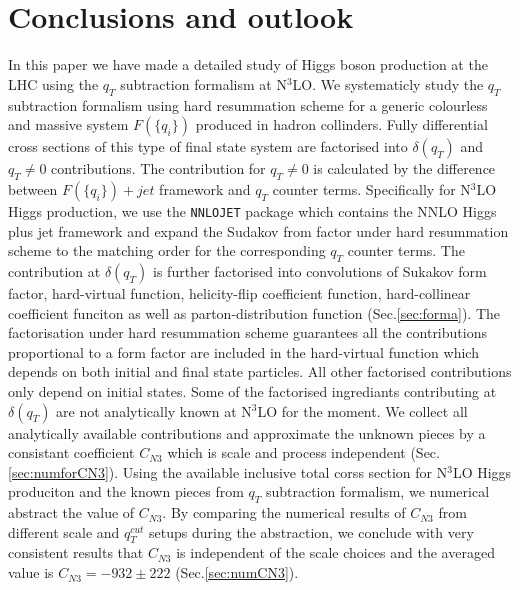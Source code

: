\documentclass[12pt]{article}
\begin{document}
\section{Conclusions and outlook}
\label{Sec:conclu}
In this paper we have made a detailed study of Higgs boson production at the LHC using the $q_T$ subtraction formalism at N$^3$LO. We systematicly study the $q_T$ subtraction formalism using hard resummation scheme for a generic colourless and massive system $F(\{q_i\})$ produced in hadron collinders. Fully differential cross sections of this type of final state system are factorised into $\delta(q_T)$ and $q_T\ne 0$ contributions. The contribution for $q_T\ne 0$ is calculated by the difference between $F(\{q_i\})+jet$ framework and $q_T$ counter terms. Specifically for N$^3$LO Higgs production, we use the \texttt{NNLOJET} package which contains the NNLO Higgs plus jet framework and expand the Sudakov from factor under hard resummation scheme to the matching order for the corresponding $q_T$ counter terms. The contribution at $\delta(q_T)$ is further factorised into convolutions of Sukakov form factor, hard-virtual function, helicity-flip coefficient function, hard-collinear coefficient funciton as well as parton-distribution function (Sec.\ref{sec:forma}). The factorisation under hard resummation scheme guarantees all the contributions proportional to a form factor are included in the hard-virtual function which depends on both initial and final state particles. All other factorised contributions only depend on initial states. Some of the factorised ingrediants contributing at $\delta(q_T)$ are not analytically known at N$^3$LO for the moment. We collect all analytically available contributions and approximate the unknown pieces by a consistant coefficient $C_{N3}$ which is scale and process independent (Sec.\ref{sec:numforCN3}). Using the available inclusive total corss section for N$^3$LO Higgs produciton and the known pieces from $q_T$ subtraction formalism, we numerical abstract the value of $C_{N3}$. By comparing the numerical results of $C_{N3}$ from different scale and $q_T^{cut}$ setups during the abstraction, we conclude with very consistent results that $C_{N3}$ is independent of the scale choices and the averaged value is $C_{N3}=-932\pm 222$ (Sec.\ref{sec:numCN3}).
\end{document}
